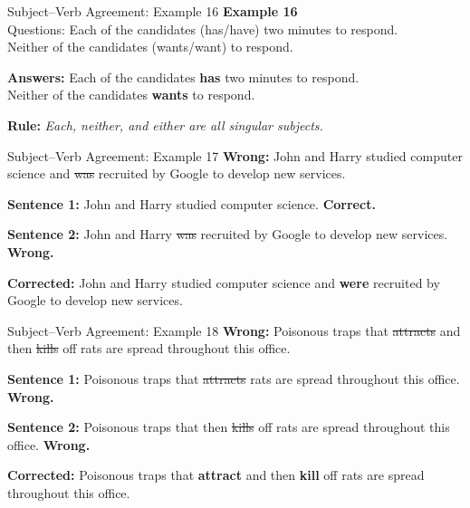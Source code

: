 \documentclass[aspectratio=169,11pt]{beamer}
\begin{document}
\begin{frame}{Subject–Verb Agreement: Example 16}
\small
\textbf{Example 16} \\
Questions:  
Each of the candidates (has/have) two minutes to respond. \\
Neither of the candidates (wants/want) to respond.  

\vspace{0.5em}
\textbf{Answers:}  
Each of the candidates \textbf{has} two minutes to respond. \\
Neither of the candidates \textbf{wants} to respond.  

\vspace{0.5em}
\textbf{Rule:} \emph{Each, neither, and either are all singular subjects.}
\end{frame}

\begin{frame}{Subject–Verb Agreement: Example 17}
\small
\textbf{Wrong:} John and Harry studied computer science and \sout{was} recruited by Google to develop new services.  

\textbf{Sentence 1:} John and Harry studied computer science. \textbf{Correct.}  

\textbf{Sentence 2:} John and Harry \sout{was} recruited by Google to develop new services. \textbf{Wrong.}  

\textbf{Corrected:} John and Harry studied computer science and \textbf{were} recruited by Google to develop new services.
\end{frame}

\begin{frame}{Subject–Verb Agreement: Example 18}
\small
\textbf{Wrong:} Poisonous traps that \sout{attracts} and then \sout{kills} off rats are spread throughout this office.  

\textbf{Sentence 1:} Poisonous traps that \sout{attracts} rats are spread throughout this office. \textbf{Wrong.}  

\textbf{Sentence 2:} Poisonous traps that then \sout{kills} off rats are spread throughout this office. \textbf{Wrong.}  

\textbf{Corrected:} Poisonous traps that \textbf{attract} and then \textbf{kill} off rats are spread throughout this office.
\end{frame}
\end{document}
